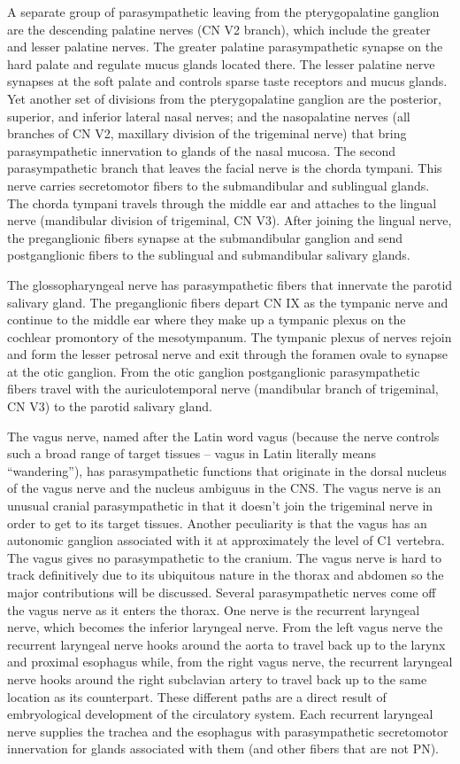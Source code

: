 A separate group of parasympathetic leaving from the pterygopalatine ganglion are the descending palatine nerves (CN V2 branch), which include the greater and lesser palatine nerves. The greater palatine parasympathetic synapse on the hard palate and regulate mucus glands located there. The lesser palatine nerve synapses at the soft palate and controls sparse taste receptors and mucus glands. Yet another set of divisions from the pterygopalatine ganglion are the posterior, superior, and inferior lateral nasal nerves; and the nasopalatine nerves (all branches of CN V2, maxillary division of the trigeminal nerve) that bring parasympathetic innervation to glands of the nasal mucosa. The second parasympathetic branch that leaves the facial nerve is the chorda tympani. This nerve carries secretomotor fibers to the submandibular and sublingual glands. The chorda tympani travels through the middle ear and attaches to the lingual nerve (mandibular division of trigeminal, CN V3). After joining the lingual nerve, the preganglionic fibers synapse at the submandibular ganglion and send postganglionic fibers to the sublingual and submandibular salivary glands.

The glossopharyngeal nerve has parasympathetic fibers that innervate the parotid salivary gland. The preganglionic fibers depart CN IX as the tympanic nerve and continue to the middle ear where they make up a tympanic plexus on the cochlear promontory of the mesotympanum. The tympanic plexus of nerves rejoin and form the lesser petrosal nerve and exit through the foramen ovale to synapse at the otic ganglion. From the otic ganglion postganglionic parasympathetic fibers travel with the auriculotemporal nerve (mandibular branch of trigeminal, CN V3) to the parotid salivary gland.

The vagus nerve, named after the Latin word vagus (because the nerve controls such a broad range of target tissues -- vagus in Latin literally means ``wandering''), has parasympathetic functions that originate in the dorsal nucleus of the vagus nerve and the nucleus ambiguus in the CNS. The vagus nerve is an unusual cranial parasympathetic in that it doesn't join the trigeminal nerve in order to get to its target tissues. Another peculiarity is that the vagus has an autonomic ganglion associated with it at approximately the level of C1 vertebra. The vagus gives no parasympathetic to the cranium. The vagus nerve is hard to track definitively due to its ubiquitous nature in the thorax and abdomen so the major contributions will be discussed. Several parasympathetic nerves come off the vagus nerve as it enters the thorax. One nerve is the recurrent laryngeal nerve, which becomes the inferior laryngeal nerve. From the left vagus nerve the recurrent laryngeal nerve hooks around the aorta to travel back up to the larynx and proximal esophagus while, from the right vagus nerve, the recurrent laryngeal nerve hooks around the right subclavian artery to travel back up to the same location as its counterpart. These different paths are a direct result of embryological development of the circulatory system. Each recurrent laryngeal nerve supplies the trachea and the esophagus with parasympathetic secretomotor innervation for glands associated with them (and other fibers that are not PN).

